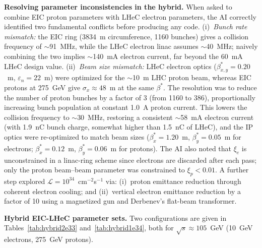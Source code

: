 \documentclass[%
               refpage,       %
               biblatex,     %
               hyphens,      %
               ]{jacow}
\begin{document}
\textbf{Resolving parameter inconsistencies in the hybrid.}
When asked to combine EIC proton parameters with LHeC electron parameters, 
the AI correctly identified two fundamental conflicts before producing any 
code. (i)~\textit{Bunch rate mismatch:} the EIC ring (3834~m circumference, 
1160 bunches) gives a collision frequency of $\sim$91~MHz, while the LHeC 
electron linac assumes $\sim$40~MHz; naively combining the two implies 
$\sim$140~mA electron current, far beyond the 60~mA LHeC design value. 
(ii)~\textit{Beam size mismatch:} LHeC electron optics 
($\beta^*_{x,y}=0.20$~m, $\varepsilon_n=22$~\textmu m) were optimized for 
the $\sim$10~\textmu m LHC proton beam, whereas EIC protons at 275~GeV give 
$\sigma_x\approx48$~\textmu m at the same $\beta^*$. 
%
%
The resolution was to reduce the number of 
proton bunches by a factor of 3 (from 1160 to 386), proportionally 
increasing bunch population at constant 1.0~A proton current. This lowers 
the collision frequency to $\sim$30~MHz, restoring a consistent 
$\sim$58~mA electron current (with 1.9~nC bunch charge, somewhat higher than 1.5~nC of LHeC), and the IP optics were re-optimized to 
match beam sizes ($\beta^*_x=1.20$~m, $\beta^*_y=0.05$~m for electrons; 
$\beta^*_x=0.12$~m, $\beta^*_y=0.06$~m for protons). The AI also noted 
that $\xi_e$ is unconstrained in a linac-ring scheme since electrons are 
discarded after each pass; only the proton beam--beam parameter was 
constrained to $\xi_p < 0.01$. 
A further step explored 
$\mathcal{L}=10^{34}$~cm$^{-2}$s$^{-1}$ via: (i)~proton emittance 
reduction through coherent electron cooling; and (ii)~vertical electron 
emittance reduction by a factor of 10 using a magnetized gun and 
Derbenev's flat-beam transformer\cite{derbenev}.

\textbf{Hybrid EIC-LHeC parameter sets.}
Two configurations are given in Tables~\ref{tab:hybrid2e33} 
and~\ref{tab:hybrid1e34}, both for $\sqrt{s}\approx105$~GeV 
(10~GeV electrons, 275~GeV protons).
\end{document}

